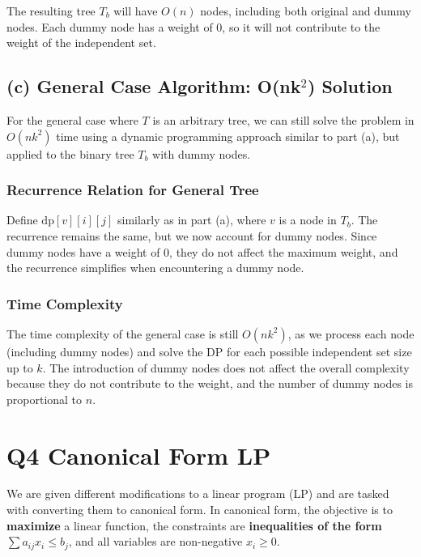 \documentclass[11pt]{article}
\begin{document}
The resulting tree \( T_b \) will have \( O(n) \) nodes, including both original and dummy nodes. Each dummy node has a weight of 0, so it will not contribute to the weight of the independent set.

\subsection*{(c) General Case Algorithm: O(nk\(^2\)) Solution}

For the general case where \( T \) is an arbitrary tree, we can still solve the problem in \( O(nk^2) \) time using a dynamic programming approach similar to part (a), but applied to the binary tree \( T_b \) with dummy nodes.

\subsubsection*{Recurrence Relation for General Tree}

Define \( \text{dp}[v][i][j] \) similarly as in part (a), where \( v \) is a node in \( T_b \). The recurrence remains the same, but we now account for dummy nodes. Since dummy nodes have a weight of 0, they do not affect the maximum weight, and the recurrence simplifies when encountering a dummy node.

\subsubsection*{Time Complexity}

The time complexity of the general case is still \( O(nk^2) \), as we process each node (including dummy nodes) and solve the DP for each possible independent set size up to \( k \). The introduction of dummy nodes does not affect the overall complexity because they do not contribute to the weight, and the number of dummy nodes is proportional to \( n \).


\newpage


\section*{Q4 Canonical Form LP}

We are given different modifications to a linear program (LP) and are tasked with converting them to canonical form. In canonical form, the objective is to \textbf{maximize} a linear function, the constraints are \textbf{inequalities of the form} \( \sum a_{ij}x_i \leq b_j \), and all variables are non-negative \( x_i \geq 0 \).
\end{document}
